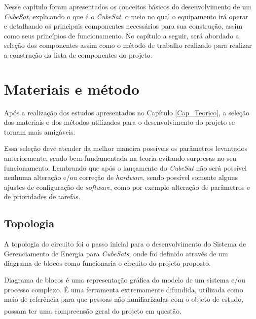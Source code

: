 \documentclass[
	12pt,				%
	openright,			%
	oneside,			%
	a4paper,			%
	english,			%
	french,				%
	spanish,			%
	brazil,				%
	oldfontcommands
	]{abntex2}
\begin{document}
	Nesse capítulo foram apresentados os conceitos básicos do desenvolvimento de um \textit{CubeSat}, explicando o que é o \textit{CubeSat}, o meio no qual o equipamento irá operar e detalhando os principais componentes necessários para sua construção, assim como seus princípios de funcionamento. No capítulo a seguir, será abordado a seleção dos componentes assim como o método de trabalho realizado para realizar a construção da lista de componentes do projeto.


\chapter[Materiais e método]{Materiais e método}

	Após a realização dos estudos apresentados no Capítulo \ref{Cap_Teorico}, a seleção dos materiais e dos métodos utilizados para o desenvolvimento do projeto se tornam mais amigáveis. 
	
	Essa seleção deve atender da melhor maneira possíveis os parâmetros levantados anteriormente, sendo bem fundamentada na teoria evitando surpresas no seu funcionamento. Lembrando que após o lançamento do \textit{CubeSat} não será possível nenhuma alteração e/ou correção de \textit{hardware}, sendo possível somente alguns ajustes de configuração de \textit{software}, como por exemplo alteração de parâmetros e de prioridades de tarefas.
	
\section[Topologia]{Topologia}

	A topologia do circuito foi o passo inicial para o desenvolvimento do Sistema de Gerenciamento de Energia para \textit{CubeSats}, onde foi definido através de um diagrama de blocos como funcionaria o circuito do projeto proposto.
	
	Diagrama de blocos é uma representação gráfica do modelo de um sistema e/ou processo complexo. É uma ferramenta extremamente difundida, utilizada como meio de referência para que pessoas não familiarizadas com o objeto de estudo, possam ter uma compreensão geral do projeto em questão.\textsuperscript{\cite{Diag_Blocos}}	
		
\end{document}
